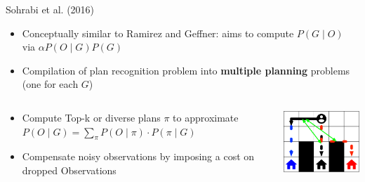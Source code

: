 \documentclass[usenames,dvipsnames]{beamer}
\begin{document}
\begin{frame}[c,allowframebreaks]
	Sohrabi et al. (2016)
	
	\begin{itemize}
		\item Conceptually similar to Ramirez and Geffner: aims to compute $P(G \mid O)$ via $\alpha P(O \mid G) P(G)$
		\item Compilation of plan recognition problem into \textbf{multiple planning} problems (one for each $G$)
	\end{itemize}
	\begin{columns}
		\begin{column}{.5\textwidth}
			\begin{itemize}
				\normalsize
				\item Compute Top-k or diverse plans $\pi$ to approximate $P(O \mid G) = \displaystyle\sum_{\pi}P(O \mid \pi)\cdot P(\pi \mid G)$
				\item Compensate noisy observations by imposing a cost on dropped Observations
			\end{itemize}
		\end{column}
		\begin{column}{.5\textwidth}
			\begin{center}
				\includegraphics[width=12em]{fig/gr-approaches/gr-ramirez.pdf}
			\end{center}
		\end{column}
	\end{columns}
\end{frame}
\end{document}
